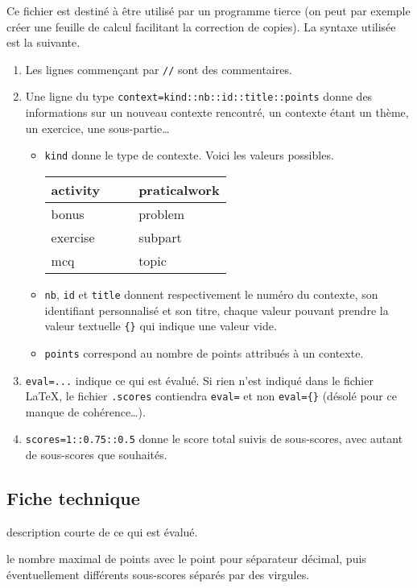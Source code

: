 \documentclass[12pt,a4paper]{scrartcl}
\begin{document}
Ce fichier est destiné à être utilisé par un programme tierce (on peut par exemple créer une feuille de calcul facilitant la correction de copies). La syntaxe utilisée est la suivante.
\begin{enumerate}
	\item Les lignes commençant par \verb+//+ sont des commentaires.

	\item Une ligne du type \verb+context=kind::nb::id::title::points+ donne des informations sur un nouveau contexte rencontré, un contexte étant un thème, un exercice, une sous-partie\dots 
	\begin{itemize}
		\item \verb+kind+ donne le type de contexte. Voici les valeurs possibles.

        \begin{center}
            \begin{tabular}{|ll@{\hskip 0.5ex}|l@{\hskip 0.5ex}l|}
                \hline activity &&& praticalwork \\
                \hline bonus &&& problem \\
                \hline exercise &&& subpart \\
                \hline mcq &&& topic \\
                \hline
            \end{tabular}
        \end{center}

		\item \verb+nb+, \verb+id+ et \verb+title+ donnent respectivement le numéro du contexte, son identifiant personnalisé et son titre, chaque valeur pouvant prendre la valeur textuelle \verb+{}+ qui indique une valeur vide.

		\item \verb+points+ correspond au nombre de points attribués à un contexte.
	\end{itemize}

	\item \verb+eval=...+ indique ce qui est évalué. Si rien n'est indiqué dans le fichier \LaTeX{}, le fichier \verb+.scores+ contiendra \verb+eval=+ et non \verb+eval={}+ (désolé pour ce manque de cohérence\dots).
	
	\item \verb+scores=1::0.75::0.5+ donne le score total suivis de sous-scores, avec autant de sous-scores que souhaités.
\end{enumerate}


    \subsection{Fiche technique}


\IDoption{} description courte de ce qui est évalué.

\IDarg{} le nombre maximal de points avec le point pour séparateur décimal, puis éventuellement différents sous-scores séparés par des virgules.
\end{document}
